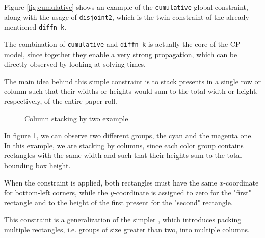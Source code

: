 \documentclass[a4paper,10pt]{article}
\newcounter{subsubsubsection}[subsubsection]
\begin{document}
Figure \ref{fig:cumulative} shows an example of the \texttt{cumulative} global constraint, along with the usage of \texttt{disjoint2}, which is the twin constraint of the already mentioned \texttt{diffn\_k}.

The combination of \texttt{cumulative} and \texttt{diffn\_k} is actually the core of the CP model, since together they enable a very strong propagation, which can be directly observed by looking at solving times.

 \label{sec:stack-two}
The main idea behind this simple constraint is to stack presents in a single row or column such that their widths or heights would sum to the total width or height, respectively, of the entire paper roll.

\begin{figure}[H]
   \centering
   \caption{Column stacking by two example}
   \label{fig:col-stacking-two}
\end{figure}

In figure \ref{fig:col-stacking-two}, we can observe two different groups, the cyan and the magenta one. In this example, we are stacking by columns, since each color group contains rectangles with the same width and such that their heights sum to the total bounding box height.

When the constraint is applied, both rectangles must have the same $x$-coordinate for bottom-left corners, while the $y$-coordinate is assigned to zero for the "first" rectangle and to the height of the first present for the "second" rectangle.

 \label{sec:column-stacking}
This constraint is a generalization of the simpler , which introduces packing multiple rectangles, i.e. groups of size greater than two, into multiple columns.
\end{document}
